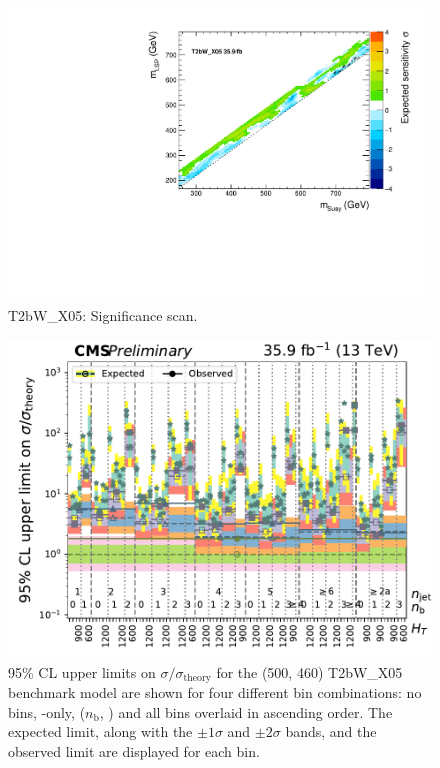 \begin{figure}[H]
\centering
\includegraphics[width=110mm]{./sec31/T2bW/finalCanvasObsSignif.pdf}
\caption{T2bW\_X05: Significance scan.}
\end{figure}

\begin{figure}[H]
\centering
\includegraphics[width=120mm]{./sec31/T2bW/SMS-T2bW_X05_mStop-500_mLSP-460_25ns_limits_nj_nb_ht.pdf}
\caption{95\% CL upper limits on $\sigma / \sigma_{\mathrm{theory}}$ for the (500, 460) T2bW\_X05 benchmark model are shown for four different bin combinations: no bins, \HT-only, ($n_{\mathrm{b}}$, \HT) and all bins overlaid in ascending order. The expected limit, along with the $\pm 1 \sigma$ and $\pm 2 \sigma$ bands, and the observed limit are displayed for each bin.}
\end{figure}


